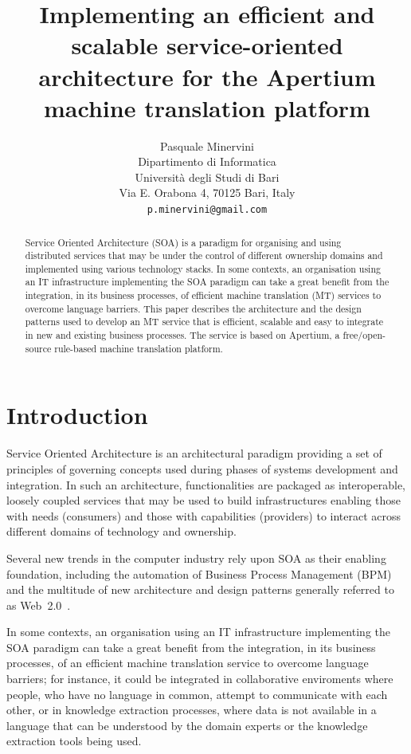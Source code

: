 \documentclass[11pt]{article}
\title{Implementing an efficient and scalable service-oriented architecture for the Apertium machine translation platform}
\author{Pasquale Minervini\\
  Dipartimento di Informatica\\
  Università degli Studi di Bari\\
  Via E. Orabona 4, 70125 Bari, Italy\\
  {\tt p.minervini@gmail.com}}
\date{}
\begin{document}
\maketitle

\begin{abstract}
Service Oriented Architecture (SOA) is a paradigm for organising and using distributed services that may be under the control of different ownership domains and implemented using various technology stacks. In some contexts, an organisation using an IT infrastructure implementing the SOA paradigm can take a great benefit from the integration, in its business processes, of efficient machine translation (MT) services to overcome language barriers. This paper describes the architecture and the design patterns used to develop an MT service that is efficient, scalable and easy to integrate in new and existing business processes. The service is based on Apertium, a free/open-source rule-based machine translation platform.
\end{abstract}


\section{Introduction}

Service Oriented Architecture is an architectural paradigm providing a set of principles of governing concepts used during phases of systems development and integration. In such an architecture, functionalities are packaged as interoperable, loosely coupled services that may be used to build infrastructures enabling those with needs (consumers) and those with capabilities (providers) to interact across different domains of technology and ownership.

Several new trends in the computer industry rely upon SOA as their enabling foundation, including the automation of Business Process Management (BPM) and the multitude of new architecture and design patterns generally referred to as Web~2.0~\citep{web20}.

In some contexts, an organisation using an IT infrastructure implementing the SOA paradigm can take a great benefit from the integration, in its business processes, of an efficient machine translation service to overcome language barriers; for instance, it could be integrated in collaborative enviroments where people, who have no language in common, attempt to communicate with each other, or in knowledge extraction processes, where data is not available in a language that can be understood by the domain experts or the knowledge extraction tools being used.
\end{document}
